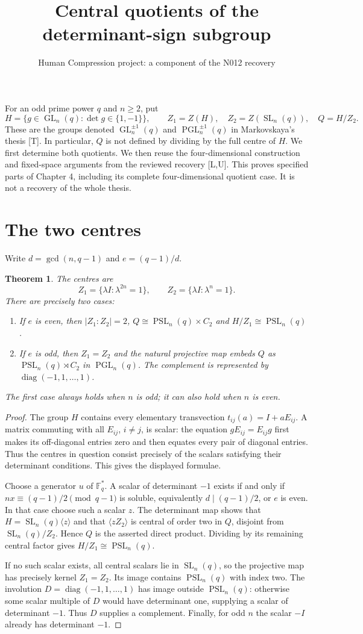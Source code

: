 \documentclass[11pt,a4paper]{article}
\title{Central quotients of the determinant-sign subgroup}
\author{Human Compression project: a component of the N012 recovery}
\date{}
\newtheorem{theorem}{Theorem}
\newcommand{\GL}{\operatorname{GL}}
\newcommand{\SL}{\operatorname{SL}}
\newcommand{\PSL}{\operatorname{PSL}}
\newcommand{\PGL}{\operatorname{PGL}}
\newcommand{\diag}{\operatorname{diag}}
\newcommand{\F}{\mathbb F}
\begin{document}
\maketitle
For an odd prime power $q$ and $n\geq2$, put
\[
 H=\{g\in\GL_n(q):\det g\in\{1,-1\}\},\qquad
 Z_1=Z(H),\quad Z_2=Z(\SL_n(q)),\quad Q=H/Z_2.
\]
These are the groups denoted $\GL_n^{\pm1}(q)$ and
$\PGL_n^{\pm1}(q)$ in Markovskaya's thesis [T]. In particular, $Q$
is not defined by dividing by the full centre of $H$.
We first determine both quotients. We then reuse the four-dimensional
construction and fixed-space arguments from the reviewed recovery [L,U].
This proves specified parts of Chapter 4, including its complete
four-dimensional quotient case. It is not a recovery of the whole thesis.

\section{The two centres}
Write $d=\gcd(n,q-1)$ and $e=(q-1)/d$.
\begin{theorem}\label{centres}
The centres are
\[
 Z_1=\{\lambda I:\lambda^{2n}=1\},\qquad
 Z_2=\{\lambda I:\lambda^n=1\}.
\]
There are precisely two cases:
\begin{enumerate}
\item If $e$ is even, then $|Z_1:Z_2|=2$,
      $Q\cong\PSL_n(q)\times C_2$ and $H/Z_1\cong\PSL_n(q)$.
\item If $e$ is odd, then $Z_1=Z_2$ and the natural projective map
      embeds $Q$ as $\PSL_n(q)\rtimes C_2$ in $\PGL_n(q)$.
      The complement is represented by $\diag(-1,1,\ldots,1)$.
\end{enumerate}
The first case always holds when $n$ is odd; it can also hold when
$n$ is even.
\end{theorem}
\begin{proof}
The group $H$ contains every elementary transvection
$t_{ij}(a)=I+aE_{ij}$. A matrix commuting with all $E_{ij}$, $i\ne j$,
is scalar: the equation $gE_{ij}=E_{ij}g$ first makes its off-diagonal
entries zero and then equates every pair of diagonal entries.
Thus the centres in question consist precisely of the scalars satisfying
their determinant conditions. This gives the displayed formulae.

Choose a generator $u$ of $\F_q^*$. A scalar of determinant $-1$ exists
if and only if $nx\equiv(q-1)/2\pmod{q-1}$ is soluble, equivalently
$d\mid(q-1)/2$, or $e$ is even. In that case choose such a scalar $z$.
The determinant map shows that $H=\SL_n(q)\langle z\rangle$ and
that $\langle zZ_2\rangle$ is central of order two in $Q$, disjoint
from $\SL_n(q)/Z_2$. Hence $Q$ is the asserted direct product.
Dividing by its remaining central factor gives $H/Z_1\cong\PSL_n(q)$.

If no such scalar exists, all central scalars lie in $\SL_n(q)$, so
the projective map has precisely kernel $Z_1=Z_2$. Its image contains
$\PSL_n(q)$ with index two. The involution $D=\diag(-1,1,\ldots,1)$
has image outside $\PSL_n(q)$: otherwise some scalar multiple of $D$
would have determinant one, supplying a scalar of determinant $-1$.
Thus $D$ supplies a complement. Finally, for odd $n$ the scalar $-I$
already has determinant $-1$.
\end{proof}
\end{document}
